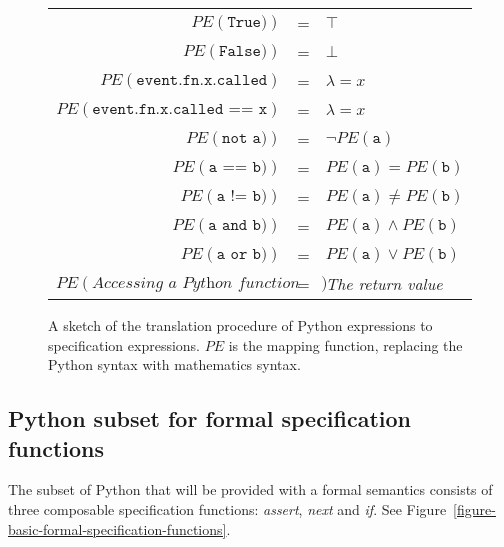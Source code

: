 \documentclass[a4paper,11pt]{kth-mag}
\begin{document}
\begin{figure}[h!]
	\begin{minipage}{0.9\textwidth}
		\centering
    \begin{tabular}{r c l}
      $PE(\texttt{True)})$ & = & $\top$ \\
      $PE(\texttt{False)})$ & = & $\bot$ \\
      $PE(\texttt{event.fn.x.called})$ & = & $\lambda = x$ \\
      $PE(\texttt{event.fn.x.called == x})$ & = & $\lambda = x$ \\
      $PE(\texttt{not a)})$ & = & $\neg PE(\texttt{a})$ \\
      $PE(\texttt{a == b)})$ & = & $PE(\texttt{a}) = PE(\texttt{b})$ \\
      $PE(\texttt{a != b)})$ & = & $PE(\texttt{a}) \neq PE(\texttt{b})$ \\
      $PE(\texttt{a and b)})$ & = & $PE(\texttt{a}) \wedge PE(\texttt{b})$ \\
      $PE(\texttt{a or b)})$ & = & $PE(\texttt{a}) \vee PE(\texttt{b})$ \\
      $PE(\textit{Accessing a Python function or property})$ & = & \textit{The return value} \\
    \end{tabular}
  \end{minipage}
  \caption{A sketch of the translation procedure of Python expressions to
    specification expressions. $PE$ is the mapping function, replacing the
    Python syntax with mathematics syntax.}
  \label{figure-semantics-translation}
\end{figure}


\subsection{Python subset for formal specification functions}
\label{section-approach-python-subset}
\lstset{language=Python,numbers=left}

The subset of Python that will be provided with a formal semantics consists of
three composable specification functions: \textit{assert},
\textit{next} and \textit{if}. See
Figure~\ref{figure-basic-formal-specification-functions}.
\end{document}
